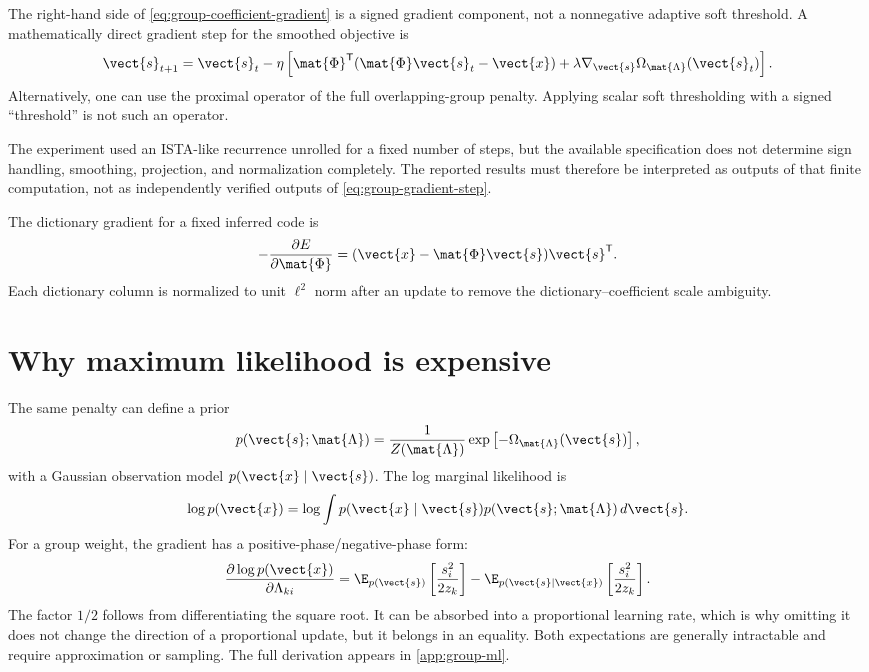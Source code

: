 The right-hand side of \cref{eq:group-coefficient-gradient} is a signed gradient component, not a nonnegative adaptive soft threshold. A mathematically direct gradient step for the smoothed objective is
\begin{equation}
\label{eq:group-gradient-step}
\vect{s}_{t+1}=\vect{s}_t-\eta
\left[
\mat{\Phi}^{\mathsf{T}}(\mat{\Phi}\vect{s}_t-\vect{x})
+\lambda\nabla_{\vect{s}}\Omega_{\mat{\Lambda}}(\vect{s}_t)
\right].
\end{equation}
Alternatively, one can use the proximal operator of the full overlapping-group penalty. Applying scalar soft thresholding with a signed ``threshold'' is not such an operator.

The experiment used an ISTA-like recurrence unrolled for a fixed number of steps, but the available specification does not determine sign handling, smoothing, projection, and normalization completely. The reported results must therefore be interpreted as outputs of that finite computation, not as independently verified outputs of \cref{eq:group-gradient-step}.

The dictionary gradient for a fixed inferred code is
\begin{equation}
\label{eq:dictionary-gradient}
-\frac{\partial E}{\partial\mat{\Phi}}
=(\vect{x}-\mat{\Phi}\vect{s})\vect{s}^{\mathsf{T}}.
\end{equation}
Each dictionary column is normalized to unit $\ell^2$ norm after an update to remove the dictionary--coefficient scale ambiguity.

\section{Why maximum likelihood is expensive}
\label{sec:group-likelihood}

The same penalty can define a prior
\begin{equation}
\label{eq:group-prior}
p(\vect{s};\mat{\Lambda})
=\frac{1}{Z(\mat{\Lambda})}
\exp\left[-\Omega_{\mat{\Lambda}}(\vect{s})\right],
\end{equation}
with a Gaussian observation model $p(\vect{x}\mid\vect{s})$. The log marginal likelihood is
\begin{equation}
\log p(\vect{x})
=\log\int p(\vect{x}\mid\vect{s})
p(\vect{s};\mat{\Lambda})\,d\vect{s}.
\end{equation}
For a group weight, the gradient has a positive-phase/negative-phase form:
\begin{equation}
\label{eq:lambda-likelihood-gradient}
\frac{\partial\log p(\vect{x})}{\partial\Lambda_{ki}}
=
\E_{p(\vect{s})}
\left[\frac{s_i^2}{2z_k}\right]
-
\E_{p(\vect{s}\mid\vect{x})}
\left[\frac{s_i^2}{2z_k}\right].
\end{equation}
The factor $1/2$ follows from differentiating the square root. It can be absorbed into a proportional learning rate, which is why omitting it does not change the direction of a proportional update, but it belongs in an equality. Both expectations are generally intractable and require approximation or sampling. The full derivation appears in \cref{app:group-ml}.

